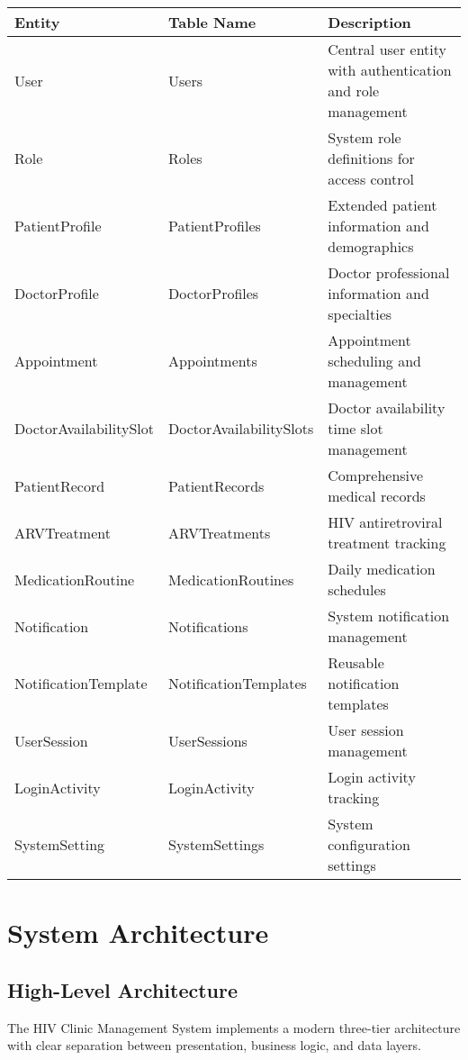 \documentclass[12pt,a4paper]{article}
\begin{document}
\begin{longtable}{|p{2cm}|p{3cm}|p{9cm}|}
\hline
\textbf{Entity} & \textbf{Table Name} & \textbf{Description} \\
\hline
User & Users & Central user entity with authentication and role management \\
\hline
Role & Roles & System role definitions for access control \\
\hline
PatientProfile & PatientProfiles & Extended patient information and demographics \\
\hline
DoctorProfile & DoctorProfiles & Doctor professional information and specialties \\
\hline
Appointment & Appointments & Appointment scheduling and management \\
\hline
DoctorAvailabilitySlot & DoctorAvailabilitySlots & Doctor availability time slot management \\
\hline
PatientRecord & PatientRecords & Comprehensive medical records \\
\hline
ARVTreatment & ARVTreatments & HIV antiretroviral treatment tracking \\
\hline
MedicationRoutine & MedicationRoutines & Daily medication schedules \\
\hline
Notification & Notifications & System notification management \\
\hline
NotificationTemplate & NotificationTemplates & Reusable notification templates \\
\hline
UserSession & UserSessions & User session management \\
\hline
LoginActivity & LoginActivity & Login activity tracking \\
\hline
SystemSetting & SystemSettings & System configuration settings \\
\hline
\end{longtable}

\section{System Architecture}

\subsection{High-Level Architecture}

The HIV Clinic Management System implements a modern three-tier architecture with clear separation between presentation, business logic, and data layers.
\end{document}
